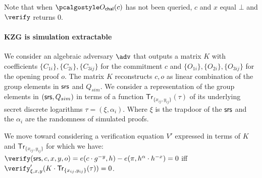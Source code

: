 \documentclass[runningheads,11pt]{llncs}
\begin{document}
\begin{definition}
\end{definition}
Note that when $\oraclec(c)$ has not been queried, $c$ and $x$ equal $\bot$ and $\verify$ returns $0$.

\paragraph{KZG is simulation extractable}

We consider an algebraic adversary $\adv$ that outputs a matrix $K$ with coefficients $\{C_{{1i}}\},\{C_{{2i}}\}, \{C_{{3ij}}\}$ for the commitment $c$ and $\{O_{{1i}}\},\{O_{{2i}}\}, \{O_{{3ij}}\}$ for the opening proof $o$. The matrix $K$ reconstructs $c,o$ as linear combination of the group elements in $\mathsf{srs}$ and $Q_{sim}$. We consider a representation of the group elements in $(\mathsf{srs},Q_{{sim}})$ in terms of a function $\mathsf{Tr}_{\{x_{ij},y_{ij}\}}(\tau)$ of its underlying secret discrete logarithms $\tau=(\xi,\alpha_{i})$. Where $\xi$ is the trapdoor of the $\mathsf{srs}$ and the $\alpha_{i}$ are the randomness of simulated proofs.

We move toward considering a verification equation $V'$ expressed in terms of $K$ and $\mathsf{Tr}_{\{x_{ij},y_{ij}\}}$ for which we have:
$\verify(\srs,c,x,y,o) =  e(c \cdot  g^{-y}, h) - e(\pi , h^{\alpha}\cdot h^{-x}) = 0$ iff $\verify'_{{\xi,x,y}}(K \cdot \mathsf{Tr}_{\{x_{ij},y_{ij}\}} (\tau)) = 0$.
\end{document}
